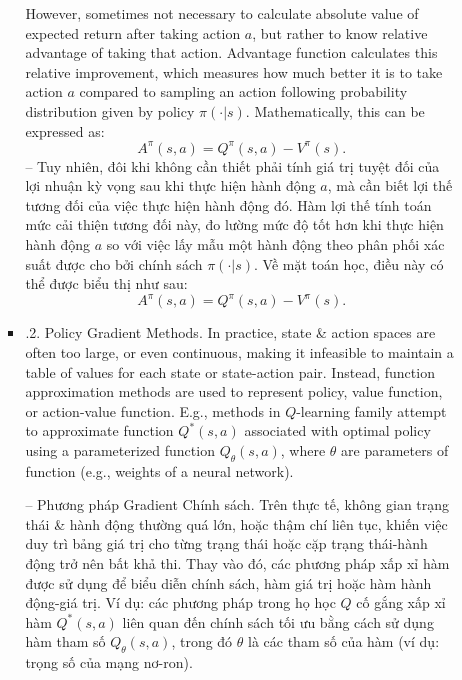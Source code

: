 \documentclass{article}
\begin{document}
\begin{itemize}
\begin{itemize}
\begin{itemize}
            However, sometimes not necessary to calculate absolute value of expected return after taking action $a$, but rather to know relative advantage of taking that action. Advantage function calculates this relative improvement, which measures how much better it is to take action $a$ compared to sampling an action following probability distribution given by policy $\pi(\cdot|s)$. Mathematically, this can be expressed as:
            \begin{equation*}
                A^\pi(s,a) = Q^\pi(s,a) - V^\pi(s).
            \end{equation*}
            -- Tuy nhiên, đôi khi không cần thiết phải tính giá trị tuyệt đối của lợi nhuận kỳ vọng sau khi thực hiện hành động $a$, mà cần biết lợi thế tương đối của việc thực hiện hành động đó. Hàm lợi thế tính toán mức cải thiện tương đối này, đo lường mức độ tốt hơn khi thực hiện hành động $a$ so với việc lấy mẫu một hành động theo phân phối xác suất được cho bởi chính sách $\pi(\cdot|s)$. Về mặt toán học, điều này có thể được biểu thị như sau:
            \begin{equation*}
                A^\pi(s,a) = Q^\pi(s,a) - V^\pi(s).
            \end{equation*}
            \item {.2. Policy Gradient Methods.} In practice, state \& action spaces are often too large, or even continuous, making it infeasible to maintain a table of values for each state or state-action pair. Instead, function approximation methods are used to represent policy, value function, or action-value function. E.g., methods in $Q$-learning family attempt to approximate function $Q^*(s,a)$ associated with optimal policy using a parameterized function $Q_\theta(s,a)$, where $\theta$ are parameters of function (e.g., weights of a neural network).

            -- {\sf Phương pháp Gradient Chính sách.} Trên thực tế, không gian trạng thái \& hành động thường quá lớn, hoặc thậm chí liên tục, khiến việc duy trì bảng giá trị cho từng trạng thái hoặc cặp trạng thái-hành động trở nên bất khả thi. Thay vào đó, các phương pháp xấp xỉ hàm được sử dụng để biểu diễn chính sách, hàm giá trị hoặc hàm hành động-giá trị. Ví dụ: các phương pháp trong họ học $Q$ cố gắng xấp xỉ hàm $Q^*(s,a)$ liên quan đến chính sách tối ưu bằng cách sử dụng hàm tham số $Q_\theta(s,a)$, trong đó $\theta$ là các tham số của hàm (ví dụ: trọng số của mạng nơ-ron).


\end{itemize}
\end{itemize}
\end{itemize}
\end{document}
